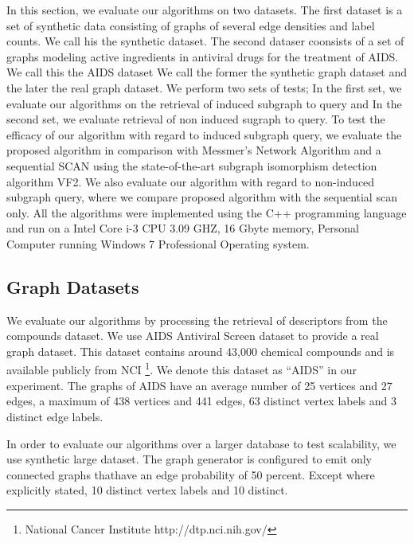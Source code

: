 In this section, we evaluate our algorithms on two  datasets. The first dataset is a set of synthetic data consisting of graphs of several edge densities and label counts. We call his the synthetic dataset. The second dataser coonsists of a set of graphs modeling active ingredients in antiviral drugs for the treatment of AIDS. We call this the AIDS dataset 
We call the former the synthetic graph dataset and the later the real graph dataset. 
We perform two sets of tests; In the first set, we evaluate 
our algorithms on the retrieval of induced subgraph to query and In the second set, we evaluate retrieval of non induced sugraph to query.  
To test the efficacy of our algorithm with regard to induced subgraph query, we evaluate the proposed algorithm in comparison with Messmer's Network Algorithm and a sequential SCAN using the state-of-the-art subgraph isomorphism detection algorithm VF2\cite{cordella2001_vf2}.
We also evaluate our algorithm with regard to non-induced subgraph query, where we compare proposed algorithm with the sequential scan only.
All the algorithms were implemented using the C++ programming language and run on a Intel Core i-3 CPU 3.09 GHZ, 16 Gbyte memory, Personal Computer running Windows 7 Professional Operating system.

\subsection{Graph Datasets}
We evaluate our algorithms by processing the retrieval of descriptors from the compounds dataset.
We use AIDS Antiviral Screen dataset to provide a real graph dataset.
This dataset contains around 43,000 chemical compounds and is available publicly from NCI
\footnote{National Cancer Institute http://dtp.nci.nih.gov/}.
We denote this dataset as ``AIDS'' in our experiment.
The graphs of AIDS have an average number of 25 vertices and 27 edges, a maximum of 438 vertices and 441 edges,
63 distinct vertex labels and 3 distinct edge labels.

In order to evaluate our algorithms over a larger database to test scalability, we use synthetic large dataset. 
The graph generator is configured to emit only connected graphs thathave an edge probability of 50 percent. 
Except where explicitly stated, 10 distinct vertex labels and 10 distinct.

